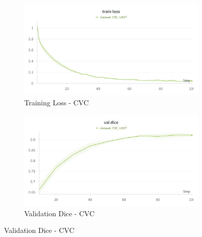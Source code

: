 \begin{figure}[h]
    \centering
    \begin{subfigure}{0.45\textwidth}
        \centering
        \includegraphics[width=\linewidth]{images/unet/cvc_train_loss.png}
        \caption{Training Loss - CVC}
    \end{subfigure}
    \hfill
    \begin{subfigure}{0.45\textwidth}
        \centering
        \includegraphics[width=\linewidth]{images/unet/cvc_val_dice.png}
        \caption{Validation Dice - CVC}
    \end{subfigure}
    

\end{figure}
